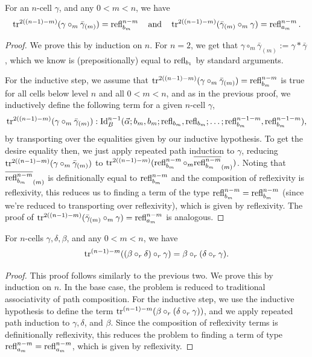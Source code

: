 \documentclass{article}
\begin{document}
\begin{prop}\label{prop:inverse}
    For an $n$-cell $\gamma$, and any $0<m<n$, we have
    $$ \operatorname{tr}^{2((n-1)-m)}(\gamma\circ_m\bar{\gamma}_{(m)})=\operatorname{refl}^{n-m}_{b_m}\quad\text{and}\quad\operatorname{tr}^{2((n-1)-m)}(\bar{\gamma}_{(m)}\circ_m\gamma)=\operatorname{refl}^{n-m}_{a_m}. $$
\end{prop}
\begin{proof}
    We prove this by induction on $n$. For $n=2$, we get that $\gamma\circ_m\bar{\gamma}_{(m)}:=\gamma*\bar{\gamma}$, which we know is (prepositionally) equal to $\operatorname{refl}_{b_1}$ by standard arguments.

    For the inductive step, we assume that $\operatorname{tr}^{2((n-1)-m)}(\gamma\circ_m\bar{\gamma}_{(m)})=\operatorname{refl}^{n-m}_{b_m}$ is true for all cells below level $n$ and all $0<m<n$, and as in the previous proof, we inductively define the following term for a given $n$-cell $\gamma$,
    $$ \operatorname{tr}^{2((n-1)-m)}(\gamma\circ_m\bar{\gamma}_{(m)}):\operatorname{Id}_B^{n-1}(\vec{\alpha};b_m,b_m;\operatorname{refl}_{b_m},\operatorname{refl}_{b_m};\dots;\operatorname{refl}^{n-1-m}_{b_m},\operatorname{refl}^{n-1-m}_{b_m}), $$
    by transporting over the equalities given by our inductive hypothesis. To get the desire equality then, we just apply repeated path induction to $\gamma$, reducing $\operatorname{tr}^{2((n-1)-m)}(\gamma\circ_m\bar{\gamma}_{(m)})$ to $\operatorname{tr}^{2((n-1)-m)}(\operatorname{refl}^{n-m}_{b_m}\circ_m\overline{\operatorname{refl}^{n-m}_{b_m}}_{(m)})$. Noting that $\overline{\operatorname{refl}^{n-m}_{b_m}}_{(m)}$ is definitionally equal to $\operatorname{refl}^{n-m}_{b_m}$ and the composition of reflexivity is reflexivity, this reduces us to finding a term of the type $\operatorname{refl}^{n-m}_{b_m}=\operatorname{refl}^{n-m}_{b_m}$ (since we're reduced to transporting over reflexivity), which is given by reflexivity. The proof of $\operatorname{tr}^{2((n-1)-m)}(\bar{\gamma}_{(m)}\circ_m\gamma)=\operatorname{refl}^{n-m}_{a_m}$ is analogous.
\end{proof}

\begin{prop}\label{prop:assoc}
    For $n$-cells $\gamma,\delta,\beta$, and any $0<m<n$, we have
    $$ \operatorname{tr}^{(n-1)-m}((\beta\circ_r\delta)\circ_r\gamma)=\beta\circ_r(\delta\circ_r\gamma). $$
\end{prop}
\begin{proof}
    This proof follows similarly to the previous two. We prove this by induction on $n$. In the base case, the problem is reduced to traditional associativity of path composition. For the inductive step, we use the inductive hypothesis to define the term $\operatorname{tr}^{(n-1)-m}(\beta\circ_r(\delta\circ_r\gamma))$, and we apply repeated path induction to $\gamma,\delta$, and $\beta$. Since the composition of reflexivity terms is definitionally reflexivity, this reduces the problem to finding a term of type $\operatorname{refl}^{n-m}_{a_m}=\operatorname{refl}^{n-m}_{a_m}$, which is given by reflexivity.
\end{proof}
\end{document}
